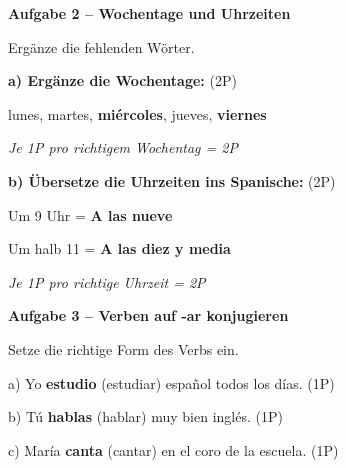 \documentclass[11pt, a4paper]{article}
\newcommand{\fachfarbe}{spanisch}
\newcommand{\punktebox}[1]{\hfill\fbox{\small \_/#1}}
\newcommand{\lsg}[1]{\textcolor{loesung}{\textbf{#1}}}
\newenvironment{aufgabe}[1]{%
    \needspace{5\baselineskip}%
    \nopagebreak[4]%
    \vspace{10pt}
    \noindent\textbf{\textcolor{\fachfarbe}{Aufgabe #1}}
    \nopagebreak[4]%
    \vspace{5pt}
    \nopagebreak[4]%
    \begin{list}{}{\leftmargin=0pt}
    \item[]
}{%
    \end{list}
}
\begin{document}

\begin{aufgabe}{2 -- Wochentage und Uhrzeiten}
Ergänze die fehlenden Wörter. \punktebox{4}
\end{aufgabe}

\noindent
\textbf{a) Ergänze die Wochentage:} (2P)

\vspace{0.5em}

\noindent
lunes, martes, \lsg{miércoles}, jueves, \lsg{viernes}

\textcolor{loesung}{\textit{Je 1P pro richtigem Wochentag = 2P}}

\vspace{1em}

\noindent
\textbf{b) Übersetze die Uhrzeiten ins Spanische:} (2P)

\vspace{0.5em}

\noindent
Um 9 Uhr = \lsg{A las nueve}

\vspace{0.8em}

\noindent
Um halb 11 = \lsg{A las diez y media}

\textcolor{loesung}{\textit{Je 1P pro richtige Uhrzeit = 2P}}

\vspace{15pt}


\begin{aufgabe}{3 -- Verben auf -ar konjugieren}
Setze die richtige Form des Verbs ein. \punktebox{6}
\end{aufgabe}

\noindent
a) Yo \lsg{estudio} (estudiar) español todos los días. \hfill (1P)

\vspace{0.8em}

\noindent
b) Tú \lsg{hablas} (hablar) muy bien inglés. \hfill (1P)

\vspace{0.8em}

\noindent
c) María \lsg{canta} (cantar) en el coro de la escuela. \hfill (1P)
\end{document}
